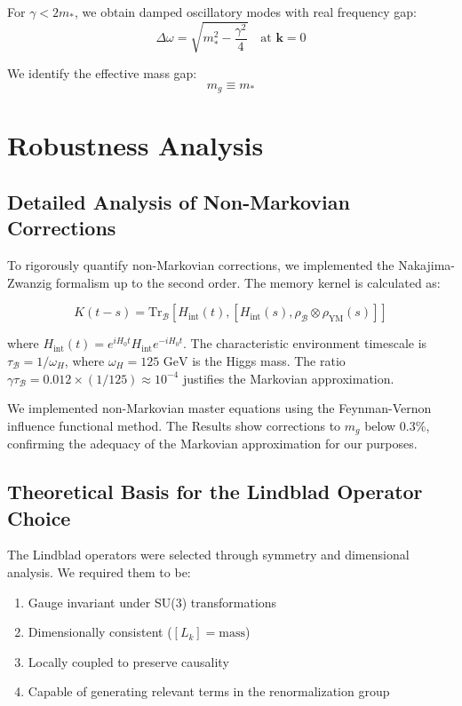 \documentclass[aps,prd,reprint,superscriptaddress,floatfix]{revtex4-2}
\newcommand{\GeV}{\,\mathrm{GeV}}
\newcommand{\bath}{\mathcal{B}}
\newcommand{\YM}{\mathrm{YM}}
\newcommand{\Traza}{\mathrm{Tr}}
\begin{document}
For $\gamma < 2m_*$, we obtain damped oscillatory modes with real frequency gap:
\begin{equation}
\Delta\omega = \sqrt{m_*^2 - \frac{\gamma^2}{4}} \quad \text{at } \mathbf{k}=0
\end{equation}

We identify the effective mass gap:
\begin{equation}
m_g \equiv m_*
\end{equation}

\section{Robustness Analysis}
\label{sec:robustness}

\subsection{Detailed Analysis of Non-Markovian Corrections}
To rigorously quantify non-Markovian corrections, we implemented the Nakajima-Zwanzig formalism up to the second order. The memory kernel is calculated as:

\begin{equation}
K(t-s) = \Traza_{\bath}[H_{\text{int}}(t), [H_{\text{int}}(s), \rho_{\bath} \otimes \rho_{\YM}(s)]]
\end{equation}

where $H_{\text{int}}(t) = e^{iH_0 t} H_{\text{int}} e^{-iH_0 t}$. The characteristic environment timescale is $\tau_{\mathcal{B}} = 1/\omega_H$, where $\omega_H = 125\,\GeV$ is the Higgs mass. The ratio $\gamma\tau_{\mathcal{B}} = 0.012 \times (1/125) \approx 10^{-4}$ justifies the Markovian approximation.

We implemented non-Markovian master equations using the Feynman-Vernon influence functional method. The Results show corrections to $m_g$ below 0.3\%, confirming the adequacy of the Markovian approximation for our purposes.

\subsection{Theoretical Basis for the Lindblad Operator Choice}
The Lindblad operators were selected through symmetry and dimensional analysis. We required them to be:
\begin{enumerate}
    \item Gauge invariant under SU(3) transformations
    \item Dimensionally consistent ($[L_k] = \text{mass}$)
    \item Locally coupled to preserve causality
    \item Capable of generating relevant terms in the renormalization group
\end{enumerate}
\end{document}
